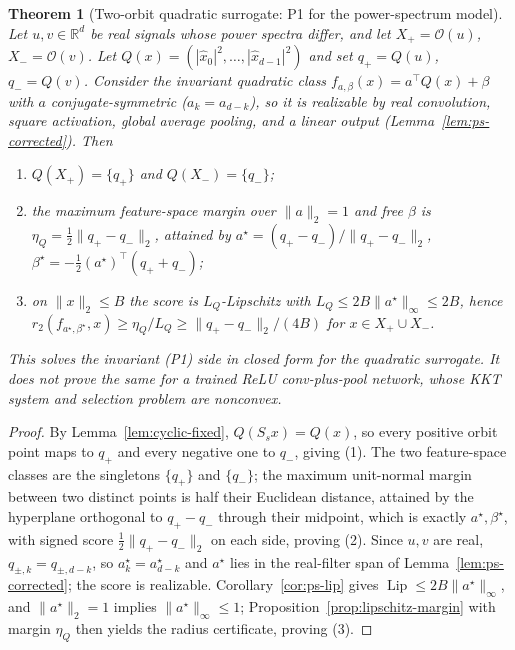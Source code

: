 \documentclass[11pt]{article}
\theoremstyle{plain}
\newtheorem{theorem}{Theorem}
\theoremstyle{definition}
\theoremstyle{remark}
\newcommand{\R}{\mathbb{R}}
\newcommand{\Lip}{\operatorname{Lip}}
\newcommand{\Orb}{\mathcal O}
\begin{document}
\begin{theorem}[Two-orbit quadratic surrogate: P1 for the power-spectrum model]\label{thm:quadratic-two-orbit}
Let $u,v\in\R^d$ be real signals whose power spectra differ, and let $X_+=\Orb(u)$, $X_-=\Orb(v)$.  Let $Q(x)=(|\hat x_0|^2,\ldots,|\hat x_{d-1}|^2)$ and set $q_+=Q(u)$, $q_-=Q(v)$.  Consider the invariant quadratic class $f_{a,\beta}(x)=a^\top Q(x)+\beta$ with $a$ conjugate-symmetric ($a_k=a_{d-k}$), so it is realizable by real convolution, square activation, global average pooling, and a linear output (Lemma~\ref{lem:ps-corrected}).  Then
\begin{enumerate}[leftmargin=1.4em]
\item $Q(X_+)=\{q_+\}$ and $Q(X_-)=\{q_-\}$;
\item the maximum feature-space margin over $\|a\|_2=1$ and free $\beta$ is $\eta_Q=\tfrac12\|q_+-q_-\|_2$, attained by $a^\star=(q_+-q_-)/\|q_+-q_-\|_2$, $\beta^\star=-\tfrac12(a^\star)^\top(q_++q_-)$;
\item on $\|x\|_2\le B$ the score is $L_Q$-Lipschitz with $L_Q\le 2B\|a^\star\|_\infty\le 2B$, hence $r_2(f_{a^\star,\beta^\star},x)\ge \eta_Q/L_Q\ge \|q_+-q_-\|_2/(4B)$ for $x\in X_+\cup X_-$.
\end{enumerate}
This solves the invariant (P1) side in closed form for the quadratic surrogate.  It does \emph{not} prove the same for a trained ReLU conv-plus-pool network, whose KKT system and selection problem are nonconvex.
\end{theorem}

\begin{proof}
By Lemma~\ref{lem:cyclic-fixed}, $Q(S_sx)=Q(x)$, so every positive orbit point maps to $q_+$ and every negative one to $q_-$, giving (1).  The two feature-space classes are the singletons $\{q_+\}$ and $\{q_-\}$; the maximum unit-normal margin between two distinct points is half their Euclidean distance, attained by the hyperplane orthogonal to $q_+-q_-$ through their midpoint, which is exactly $a^\star,\beta^\star$, with signed score $\tfrac12\|q_+-q_-\|_2$ on each side, proving (2).  Since $u,v$ are real, $q_{\pm,k}=q_{\pm,d-k}$, so $a^\star_k=a^\star_{d-k}$ and $a^\star$ lies in the real-filter span of Lemma~\ref{lem:ps-corrected}; the score is realizable.  Corollary~\ref{cor:ps-lip} gives $\Lip\le 2B\|a^\star\|_\infty$, and $\|a^\star\|_2=1$ implies $\|a^\star\|_\infty\le1$; Proposition~\ref{prop:lipschitz-margin} with margin $\eta_Q$ then yields the radius certificate, proving (3).
\end{proof}
\end{document}
